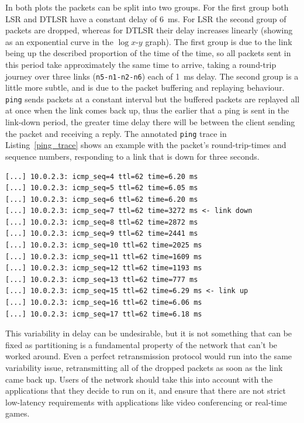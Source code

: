 \documentclass[withindex,glossary,openany]{cam-thesis}
\begin{document}
In both plots the packets can be split into two groups. For the first group both LSR and DTLSR have a constant delay of \SI{6}{\ms}. For LSR the second group of packets are dropped, whereas for DTLSR their delay increases linearly (showing as an exponential curve in the $\log x$-$y$ graph). The first group is due to the link being up the described proportion of the time of the time, so all packets sent in this period take approximately the same time to arrive, taking a round-trip journey over three links (\texttt{n5-n1-n2-n6}) each of \SI{1}{\ms} delay. The second group is a little more subtle, and is due to the packet buffering and replaying behaviour. \texttt{ping} sends packets at a constant interval but the buffered packets are replayed all at once when the link comes back up, thus the earlier that a ping is sent in the link-down period, the greater time delay there will be between the client sending the packet and receiving a reply. The annotated \texttt{ping} trace in Listing~\ref{ping_trace} shows an example with the packet's round-trip-times and sequence numbers, responding to a link that is down for three seconds.

\begin{lstlisting}[label=ping_trace, caption=Example \texttt{ping} trace with link flapping, frame=tb]
[...] 10.0.2.3: icmp_seq=4 ttl=62 time=6.20 ms
[...] 10.0.2.3: icmp_seq=5 ttl=62 time=6.05 ms
[...] 10.0.2.3: icmp_seq=6 ttl=62 time=6.20 ms
[...] 10.0.2.3: icmp_seq=7 ttl=62 time=3272 ms <- link down
[...] 10.0.2.3: icmp_seq=8 ttl=62 time=2872 ms
[...] 10.0.2.3: icmp_seq=9 ttl=62 time=2441 ms
[...] 10.0.2.3: icmp_seq=10 ttl=62 time=2025 ms
[...] 10.0.2.3: icmp_seq=11 ttl=62 time=1609 ms
[...] 10.0.2.3: icmp_seq=12 ttl=62 time=1193 ms
[...] 10.0.2.3: icmp_seq=13 ttl=62 time=777 ms
[...] 10.0.2.3: icmp_seq=15 ttl=62 time=6.29 ms <- link up
[...] 10.0.2.3: icmp_seq=16 ttl=62 time=6.06 ms
[...] 10.0.2.3: icmp_seq=17 ttl=62 time=6.18 ms
\end{lstlisting}

This variability in delay can be undesirable, but it is not something that can be fixed as partitioning is a fundamental property of the network that can't be worked around. Even a perfect retransmission protocol would run into the same variability issue, retransmitting all of the dropped packets as soon as the link came back up. Users of the network should take this into account with the applications that they decide to run on it, and ensure that there are not strict low-latency requirements with applications like video conferencing or real-time games.
\end{document}

